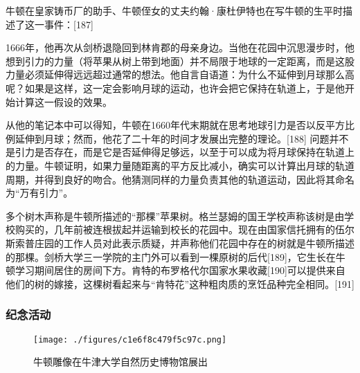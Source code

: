 牛顿在皇家铸币厂的助手、牛顿侄女的丈夫约翰·康杜伊特也在写牛顿的生平时描述了这一事件：[187]

1666年，他再次从剑桥退隐回到林肯郡的母亲身边。当他在花园中沉思漫步时，他想到引力的力量（将苹果从树上带到地面）并不局限于地球的一定距离，而是这股力量必须延伸得远远超过通常的想法。他自言自语道：为什么不延伸到月球那么高呢？如果是这样，这一定会影响月球的运动，也许会把它保持在轨道上，于是他开始计算这一假设的效果。

从他的笔记本中可以得知，牛顿在1660年代末期就在思考地球引力是否以反平方比例延伸到月球；然而，他花了二十年的时间才发展出完整的理论。[188] 问题并不是引力是否存在，而是它是否延伸得足够远，以至于可以成为将月球保持在轨道上的力量。牛顿证明，如果力量随距离的平方反比减小，确实可以计算出月球的轨道周期，并得到良好的吻合。他猜测同样的力量负责其他的轨道运动，因此将其命名为“万有引力”。

多个树木声称是牛顿所描述的“那棵”苹果树。格兰瑟姆的国王学校声称该树是由学校购买的，几年前被连根拔起并运输到校长的花园中。现在由国家信托拥有的伍尔斯索普庄园的工作人员对此表示质疑，并声称他们花园中存在的树就是牛顿所描述的那棵。剑桥大学三一学院的主门外可以看到一棵原树的后代[189]，它生长在牛顿学习期间居住的房间下方。肯特的布罗格代尔国家水果收藏[190]可以提供来自他们的树的嫁接，这棵树看起来与“肯特花”这种粗肉质的烹饪品种完全相同。[191]
\subsubsection{纪念活动}
\begin{figure}[ht]
\centering
\texttt{[image: ./figures/c1e6f8c479f5c97c.png]}
\caption{牛顿雕像在牛津大学自然历史博物馆展出} \label{fig_Newton_14}
\end{figure}